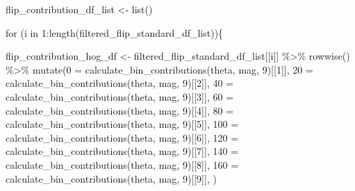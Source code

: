 \documentclass[
  letterpaper,
  DIV=11,
  numbers=noendperiod]{scrreprt}
\newenvironment{Shaded}{\begin{snugshade}}{\end{snugshade}}
\newcommand{\AttributeTok}[1]{\textcolor[rgb]{0.40,0.45,0.13}{#1}}
\newcommand{\ControlFlowTok}[1]{\textcolor[rgb]{0.00,0.23,0.31}{#1}}
\newcommand{\DecValTok}[1]{\textcolor[rgb]{0.68,0.00,0.00}{#1}}
\newcommand{\FunctionTok}[1]{\textcolor[rgb]{0.28,0.35,0.67}{#1}}
\newcommand{\NormalTok}[1]{\textcolor[rgb]{0.00,0.23,0.31}{#1}}
\newcommand{\OtherTok}[1]{\textcolor[rgb]{0.00,0.23,0.31}{#1}}
\newcommand{\SpecialCharTok}[1]{\textcolor[rgb]{0.37,0.37,0.37}{#1}}
\newcommand{\StringTok}[1]{\textcolor[rgb]{0.13,0.47,0.30}{#1}}
\begin{document}
\begin{Shaded}
\begin{Highlighting}[]
\NormalTok{flip\_contribution\_df\_list }\OtherTok{\textless{}{-}} \FunctionTok{list}\NormalTok{()}


\ControlFlowTok{for}\NormalTok{ (i }\ControlFlowTok{in} \DecValTok{1}\SpecialCharTok{:}\FunctionTok{length}\NormalTok{(filtered\_flip\_standard\_df\_list))\{}

\NormalTok{  flip\_contribution\_hog\_df }\OtherTok{\textless{}{-}}
\NormalTok{    filtered\_flip\_standard\_df\_list[[i]] }\SpecialCharTok{\%\textgreater{}\%}
    \FunctionTok{rowwise}\NormalTok{() }\SpecialCharTok{\%\textgreater{}\%}
    \FunctionTok{mutate}\NormalTok{(}\StringTok{\textasciigrave{}}\AttributeTok{0}\StringTok{\textasciigrave{}} \OtherTok{=} \FunctionTok{calculate\_bin\_contributions}\NormalTok{(theta, mag, }\DecValTok{9}\NormalTok{)[[}\DecValTok{1}\NormalTok{]],}
           \StringTok{\textasciigrave{}}\AttributeTok{20}\StringTok{\textasciigrave{}} \OtherTok{=} \FunctionTok{calculate\_bin\_contributions}\NormalTok{(theta, mag, }\DecValTok{9}\NormalTok{)[[}\DecValTok{2}\NormalTok{]],}
           \StringTok{\textasciigrave{}}\AttributeTok{40}\StringTok{\textasciigrave{}} \OtherTok{=} \FunctionTok{calculate\_bin\_contributions}\NormalTok{(theta, mag, }\DecValTok{9}\NormalTok{)[[}\DecValTok{3}\NormalTok{]],}
           \StringTok{\textasciigrave{}}\AttributeTok{60}\StringTok{\textasciigrave{}} \OtherTok{=} \FunctionTok{calculate\_bin\_contributions}\NormalTok{(theta, mag, }\DecValTok{9}\NormalTok{)[[}\DecValTok{4}\NormalTok{]],}
           \StringTok{\textasciigrave{}}\AttributeTok{80}\StringTok{\textasciigrave{}} \OtherTok{=} \FunctionTok{calculate\_bin\_contributions}\NormalTok{(theta, mag, }\DecValTok{9}\NormalTok{)[[}\DecValTok{5}\NormalTok{]],}
           \StringTok{\textasciigrave{}}\AttributeTok{100}\StringTok{\textasciigrave{}} \OtherTok{=} \FunctionTok{calculate\_bin\_contributions}\NormalTok{(theta, mag, }\DecValTok{9}\NormalTok{)[[}\DecValTok{6}\NormalTok{]],}
           \StringTok{\textasciigrave{}}\AttributeTok{120}\StringTok{\textasciigrave{}} \OtherTok{=} \FunctionTok{calculate\_bin\_contributions}\NormalTok{(theta, mag, }\DecValTok{9}\NormalTok{)[[}\DecValTok{7}\NormalTok{]],}
           \StringTok{\textasciigrave{}}\AttributeTok{140}\StringTok{\textasciigrave{}} \OtherTok{=} \FunctionTok{calculate\_bin\_contributions}\NormalTok{(theta, mag, }\DecValTok{9}\NormalTok{)[[}\DecValTok{8}\NormalTok{]],}
           \StringTok{\textasciigrave{}}\AttributeTok{160}\StringTok{\textasciigrave{}} \OtherTok{=} \FunctionTok{calculate\_bin\_contributions}\NormalTok{(theta, mag, }\DecValTok{9}\NormalTok{)[[}\DecValTok{9}\NormalTok{]],}
\NormalTok{           )}


\end{Highlighting}
\end{Shaded}
\end{document}
